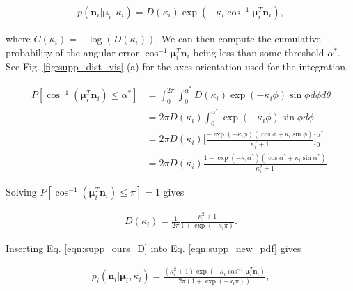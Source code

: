 \documentclass[10pt,twocolumn,letterpaper]{article}
\begin{document}
\begin{equation}
\begin{aligned}
\label{eqn:supp_new_pdf}
p(\mathbf{n}_i|\boldsymbol{\mu}_i,\kappa_i)
= D(\kappa_i) \exp (-\kappa_i \cos^{-1} 
\boldsymbol{\mu}_i^T \mathbf{n}_i),
\end{aligned}
\end{equation}

\noindent
where $C(\kappa_i) = -\log(D(\kappa_i))$. We can then compute the cumulative probability of the angular error $\cos^{-1} 
\boldsymbol{\mu}_i^T \mathbf{n}_i$ being less than some threshold $\alpha^*$. See Fig. \ref{fig:supp_dist_vis}-(a) for the axes orientation used for the integration.
 
\begin{equation}
\begin{aligned}
\label{eqn:supp_new_cdf}
P[\cos^{-1} (\boldsymbol{\mu}_i^T \mathbf{n}_i) \leq \alpha^*]
&= 
\int^{2\pi}_{0} 
\int^{\alpha^*}_0 
D(\kappa_i)
\exp(-\kappa_i \phi) \sin \phi d\phi d\theta
\\
&= 2\pi D(\kappa_i)
\int^{\alpha^*}_0
\exp(-\kappa_i \phi) \sin \phi d\phi 
\\
&= 2\pi D(\kappa_i) 
\bigg[ \frac{-\exp(-\kappa_i \phi) (\cos \phi + \kappa_i \sin \phi)}{\kappa_i^2 + 1} \bigg]^{\alpha^*}_0 
\\
&= 2\pi D(\kappa_i)
\frac{1 - \exp(-\kappa_i \alpha^*) (\cos \alpha^* + \kappa_i \sin \alpha^*)}{\kappa_i^2 + 1}
\end{aligned}
\end{equation}

\noindent
Solving $P[\cos^{-1} (\boldsymbol{\mu}_i^T \mathbf{n}_i) \leq \pi] = 1$ gives

\begin{equation}
\begin{aligned}
\label{eqn:supp_ours_D}
D(\kappa_i) = \frac{1}{2\pi} \frac{\kappa_i^2 + 1}{1 + \exp(-\kappa_i \pi)}.
\end{aligned}
\end{equation}

\noindent
Inserting Eq. \ref{eqn:supp_ours_D} into Eq. \ref{eqn:supp_new_pdf} gives 

\begin{equation}
\begin{aligned}
\label{eqn:supp_new_pdf2}
p_{i}(\mathbf{n}_i|\boldsymbol{\mu}_i,\kappa_i) = 
\frac{(\kappa_i^2+1)\exp(-\kappa_i \cos^{-1} \boldsymbol{\mu}_i^T \mathbf{n}_i)}{2\pi (1 + \exp(-\kappa_i \pi))},
\end{aligned}
\end{equation}
\end{document}
